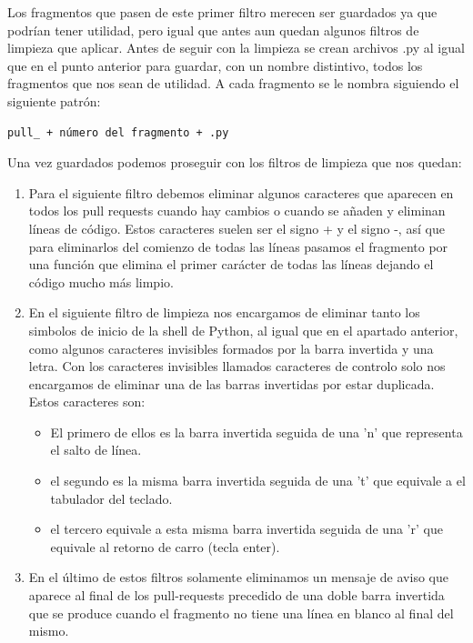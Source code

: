 \documentclass[a4paper, 12pt]{book}
\begin{document}
Los fragmentos que pasen de este primer filtro merecen ser guardados ya que podrían tener utilidad, pero igual que antes aun quedan algunos filtros de limpieza que aplicar. Antes de seguir con la limpieza se crean archivos .py al igual que en el punto anterior para guardar, con un nombre distintivo, todos los fragmentos que nos sean de utilidad. A cada fragmento se le nombra siguiendo el siguiente patrón:
 
\begin{verbatim}
pull_ + número del fragmento + .py
\end{verbatim}

Una vez guardados podemos proseguir con los filtros de limpieza que nos quedan:

\begin{enumerate}
	\item Para el siguiente filtro debemos eliminar algunos caracteres que aparecen en todos los pull requests cuando hay cambios o cuando se añaden y eliminan líneas de código. Estos caracteres suelen ser el signo + y el signo -, así que para eliminarlos del comienzo de todas las líneas pasamos el fragmento por una función que elimina el primer carácter de todas las líneas dejando el código mucho más limpio.
	\item En el siguiente filtro de limpieza nos encargamos de eliminar tanto los simbolos de inicio de la shell de Python, al igual que en el apartado anterior, como algunos caracteres invisibles formados por la barra invertida y una letra. Con los caracteres invisibles llamados caracteres de controlo solo nos encargamos de eliminar una de las barras invertidas por estar duplicada. Estos caracteres son:
	\begin{itemize}
		\item El primero de ellos es la barra invertida seguida de una 'n' que representa el salto de línea.
		\item el segundo es la misma barra invertida seguida de una 't' que equivale a el tabulador del teclado.
		\item el tercero equivale a esta misma barra invertida seguida de una 'r' que equivale al retorno de carro (tecla enter).
	\end{itemize}
	\item En el último de estos filtros solamente eliminamos un mensaje de aviso que aparece al final de los pull-requests precedido de una doble barra invertida que se produce cuando el fragmento no tiene una línea en blanco al final del mismo.
\end{enumerate}
\end{document}
